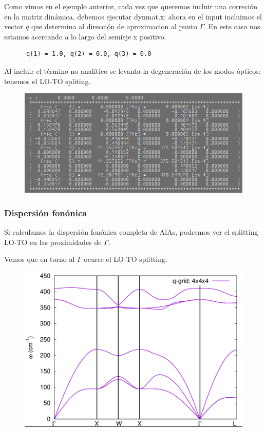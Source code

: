   Como vimos en el ejemplo anterior, cada vez que queremos incluir una correción en la matriz dinámica, debemos ejecutar dynmat.x: ahora en el input incluimos el vector $q$ que determina al dirección  de aproximacion al punto $\Gamma$. En este caso nos estamos acercando a lo largo del semieje x positivo.
    \begin{verbatim}
      q(1) = 1.0, q(2) = 0.0, q(3) = 0.0
    \end{verbatim}

  Al incluir el término no analítico se levanta la degeneración de los modos ópticos: tenemos el LO-TO spliting.
    \begin{figure}[H]
        \centering
        \includegraphics[scale = 0.6]{figs/D5/AlAs_post.png}
    \end{figure}

\subsubsection{Dispersión fonónica}

  Si calculamos la dispersión fonónica completa de AlAs, podremos ver el splitting LO-TO en las proximidades de $\Gamma$.


  Vemos que en torno al $\Gamma$ ocurre el LO-TO splitting.

    \begin{figure}[H]
        \centering
        \includegraphics[scale = 0.4]{figs/D5/AlAs_disp.png}
    \end{figure}

